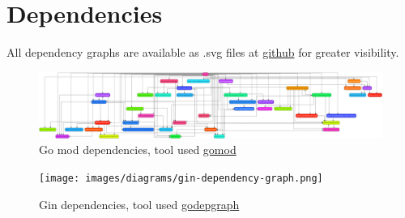 \section{Dependencies}\label{app:gomod_dependencies}
All dependency graphs are available as .svg files at \href{https://github.com/DevelOpsITU/DevOps_report/tree/main/images/diagrams}{github} for greater visibility.

\begin{figure}[H]
    \centering
    \includegraphics[width=\linewidth%
    ]{images/diagrams/gomod-dependency-graph.png}
    \caption{Go mod dependencies, tool used \href{https://github.com/Helcaraxan/gomod}{gomod}}
    \label{fig:gomod_dependencies}
\end{figure}

\begin{figure}[H]
    \centering
    \texttt{[image: images/diagrams/gin-dependency-graph.png]}
    \caption{Gin dependencies, tool used \href{https://github.com/kisielk/godepgraph}{godepgraph}}
    \label{fig:gin_dependencies}
\end{figure}